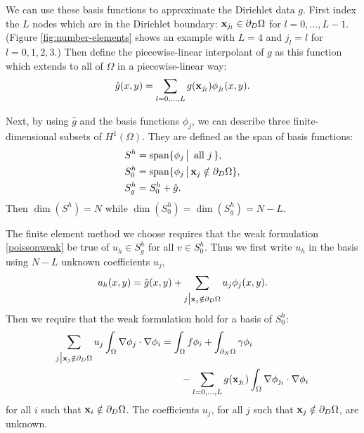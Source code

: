 We can use these basis functions to approximate the Dirichlet data $g$.  First index the $L$ nodes which are in the Dirichlet boundary: $\mathbf{x}_{j_l} \in \partial_D\Omega$ for $l=0,\dots,L-1$.  (Figure \ref{fig:number-elements} shows an example with $L=4$ and $j_l=l$ for $l=0,1,2,3$.)  Then define the piecewise-linear interpolant of $g$ as this function which extends to all of $\Omega$ in a piecewise-linear way:
\begin{equation*}
\hat g(x,y) = \sum_{l=0,\dots,L} g(\mathbf{x}_{j_l}) \phi_{j_l}(x,y).
\end{equation*}

Next, by using $\hat g$ and the basis functions $\phi_j$, we can describe three finite-dimensional subsets of $H^1(\Omega)$.  They are defined as the span of basis functions:
\begin{align*}
S^h &= \operatorname{span}\{\phi_j \,\big|\, \text{ all } j\,\}, \\
S_0^h &= \operatorname{span}\{\phi_j \,\big|\, \mathbf{x}_j \notin \partial_D \Omega\}, \\
S_g^h &= S_0^h + \hat g.
\end{align*}
Then $\dim(S^h)=N$ while $\dim(S_0^h)=\dim(S_g^h)=N-L$.

The finite element method we choose requires that the weak formulation  \eqref{poissonweak} be true of $u_h\in S_g^h$ for all $v\in S_0^h$.  Thus we first write $u_h$ in the basis using $N-L$ unknown coefficients $u_j$,
\begin{equation*}
u_h(x,y) = \hat g(x,y) + \sum_{j\big|\mathbf{x}_j \notin \partial_D \Omega} u_j \phi_j(x,y).
\end{equation*}
Then we require that the weak formulation hold for a basis of $S_0^h$:
\begin{align}
\sum_{j\big|\mathbf{x}_j \notin \partial_D \Omega} u_j \int_\Omega \nabla \phi_j \cdot \nabla \phi_i &= \int_\Omega f \phi_i + \int_{\partial_N\Omega} \gamma \phi_i \label{poissonfem} \\
&\qquad - \sum_{l=0,\dots,L} g(\mathbf{x}_{j_l})  \int_\Omega \nabla \phi_{j_l} \cdot \nabla \phi_i \notag
\end{align}
for all $i$ such that $\mathbf{x}_i \notin \partial_D \Omega$.  The coefficients $u_j$, for all $j$ such that $\mathbf{x}_j \notin \partial_D \Omega$, are unknown.

